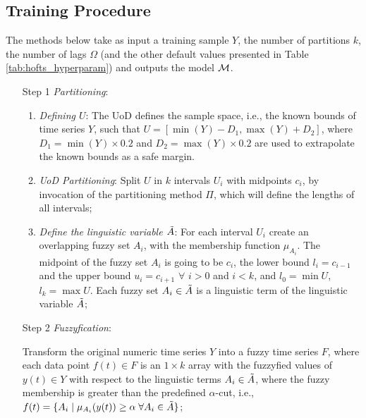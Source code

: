 %
\subsection{Training Procedure}
\label{sec:fts_training_procedure}

The methods below take as input a training sample $Y$, the number of partitions $k$, the number of lags $\Omega$ (and the other default values presented in Table \ref{tab:hofts_hyperparam}) and outputs the model $\model$.
\index{$\model$}


\begin{enumerate}
\item[Step 1] \textit{Partitioning}:
\begin{enumerate}
\item \textit{Defining $U$}: The UoD defines the sample space, i.e., the known bounds of time series $Y$, such that $U = [\min(Y)-D_1, \max(Y)+D_2]$, where $D_1 = \min(Y)\times 0.2$ and $D_2 = \max(Y)\times 0.2$ are used to extrapolate the known bounds as a safe margin. 

\item \textit{UoD Partitioning}: Split $U$ in $k$ intervals $U_i$ with midpoints $c_i$, by invocation of the partitioning method $\Pi$, which will define the lengths of all intervals;

\item \textit{Define the linguistic variable $\Tilde{A}$}: For each interval $U_i$ create an overlapping fuzzy set $A_i$, with the membership function $\mu_{A_i}$. The midpoint of the fuzzy set $A_i$ is going to be $c_i$, the lower bound $l_i = c_{i-1}$ and the upper bound $u_i = c_{i+1}$ $\forall$ $i >0$ and $i < k$, and $l_0 = \min U$, $l_k = \max U$. Each fuzzy set $A_i \in \Tilde{A}$ is a linguistic term of the linguistic variable $\Tilde{A}$;
\end{enumerate}

\item[Step 2] \textit{Fuzzyfication}: 

Transform the original numeric time series $Y$ into a fuzzy time series $F$, where each data point $f(t) \in F$ is an $1\times k$ array with the fuzzyfied values of $y(t) \in Y$ with respect to the linguistic terms $A_i \in \Tilde{A}$, where the fuzzy membership is greater than the predefined $\alpha$-cut, i.e., $f(t) = \{A_i\; |\; \mu_{A_i}(y(t)) \geq \alpha\;\forall A_i \in \Tilde{A}\}$;


\end{enumerate}
